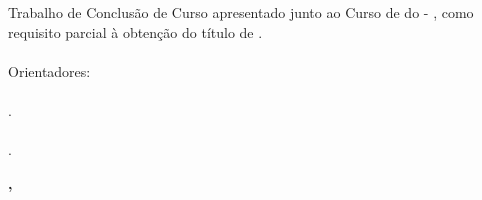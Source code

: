 %
%

\makeatletter
\begin{folhaderosto}
	\thispagestyle{empty}%
	
    \begin{center}
    
		\small\textbf{\expandafter\uppercase\expandafter{\imprimirnomeautor}}\\
		\vspace*{6.2 cm}%
		\normalsize\textbf{\expandafter\uppercase\expandafter{\imprimirtitulotb}}\\
		
    \end{center}
	
	\vspace*{2.35 cm}%
		    \large%
    		\hfill%
	    	\begin{minipage}{8 cm}%
	    		\begin{small} %
	    		\setlength{\baselineskip}{0.7\baselineskip}
				
		    	{Trabalho de Conclusão de Curso apresentado junto ao Curso de {\imprimirprograma }
		    	{\imprimirmodalidade} do {\imprimirinstituicao}{ - }{\imprimirdepartamento},
		    	como requisito parcial à obtenção do título de
		    	{\imprimirgrau }.}\\{
		    	}\\Orientadores:\\ \\
		    	{\imprimirtitulacaoorientador }{ }{\imprimirorientador.}\\{
		    	}\\ {\imprimirtitulacaocoorientador }{ }{\imprimircoorientador.}
				
				
				\end{small} %
		    \end{minipage}%
		    	
		    \vspace*{6 cm}%
		    
		    \begin{center} %
		    	\normalsize %
	    		\textbf{\imprimirlocalapresentacao, \imprimirdataapresentacao}
	    	\end{center}%

\end{folhaderosto}
\makeatother
